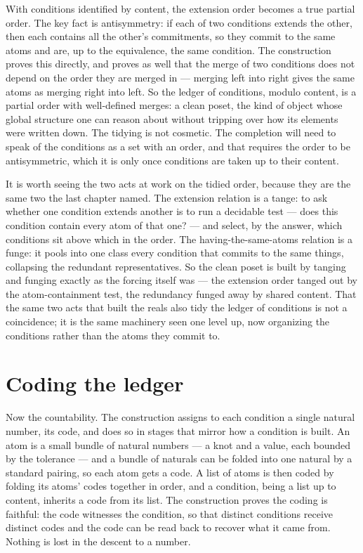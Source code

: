 With conditions identified by content, the extension order becomes a true partial order. The key fact is
antisymmetry: if each of two conditions extends the other, then each contains all the other's
commitments, so they commit to the same atoms and are, up to the equivalence, the same condition. The
construction proves this directly, and proves as well that the merge of two conditions does not depend on
the order they are merged in --- merging left into right gives the same atoms as merging right into left.
So the ledger of conditions, modulo content, is a partial order with well-defined merges: a clean poset,
the kind of object whose global structure one can reason about without tripping over how its elements
were written down. The tidying is not cosmetic. The completion will need to speak of the conditions as a
set with an order, and that requires the order to be antisymmetric, which it is only once conditions are
taken up to their content.

It is worth seeing the two acts at work on the tidied order, because they are the same two the last
chapter named. The extension relation is a tange: to ask whether one condition extends another is to run
a decidable test --- does this condition contain every atom of that one? --- and select, by the answer,
which conditions sit above which in the order. The having-the-same-atoms relation is a funge: it pools
into one class every condition that commits to the same things, collapsing the redundant representatives.
So the clean poset is built by tanging and funging exactly as the forcing itself was --- the extension
order tanged out by the atom-containment test, the redundancy funged away by shared content. That the
same two acts that built the reals also tidy the ledger of conditions is not a coincidence; it is the
same machinery seen one level up, now organizing the conditions rather than the atoms they commit to.

\section{Coding the ledger}
\label{se:coding-the-ledger}

Now the countability. The construction assigns to each condition a single natural number, its code, and
does so in stages that mirror how a condition is built. An atom is a small bundle of natural numbers --- a
knot and a value, each bounded by the tolerance --- and a bundle of naturals can be folded into one
natural by a standard pairing, so each atom gets a code. A list of atoms is then coded by folding its
atoms' codes together in order, and a condition, being a list up to content, inherits a code from its
list. The construction proves the coding is faithful: the code witnesses the condition, so that distinct
conditions receive distinct codes and the code can be read back to recover what it came from. Nothing is
lost in the descent to a number.

